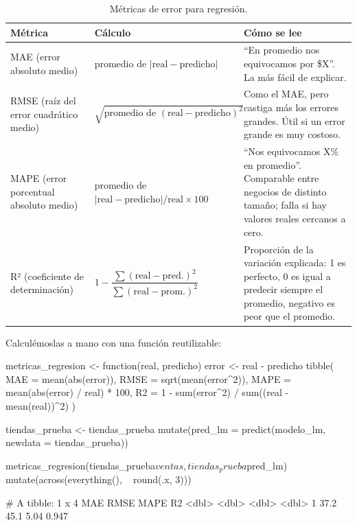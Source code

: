 \begin{table}[H]
\centering
\small
\caption{Métricas de error para regresión.}
\label{tab:m7-metricas-reg}
\begin{tabularx}{\textwidth}{>{\raggedright\arraybackslash}p{2.2cm}
                              >{\raggedright\arraybackslash}p{5.4cm}
                              >{\raggedright\arraybackslash}X}
\toprule
\textbf{Métrica} & \textbf{Cálculo} & \textbf{Cómo se lee} \\
\midrule
MAE (error absoluto medio) & promedio de $|\text{real} - \text{predicho}|$ &
  ``En promedio nos equivocamos por \$X''. La más fácil de explicar. \\
RMSE (raíz del error cuadrático medio) &
  $\sqrt{\text{promedio de } (\text{real} - \text{predicho})^2}$ &
  Como el MAE, pero castiga más los errores grandes. Útil si un error grande
  es muy costoso. \\
MAPE (error porcentual absoluto medio) &
  promedio de $|\text{real} - \text{predicho}| / \text{real} \times 100$ &
  ``Nos equivocamos X\% en promedio''. Comparable entre negocios de distinto
  tamaño; falla si hay valores reales cercanos a cero. \\
R² (coeficiente de determinación) &
  $1 - \dfrac{\sum (\text{real} - \text{pred.})^2}{\sum (\text{real} - \text{prom.})^2}$ &
  Proporción de la variación explicada: 1 es perfecto, 0 es igual a predecir
  siempre el promedio, negativo es peor que el promedio. \\
\bottomrule
\end{tabularx}
\end{table}

Calculémoslas a mano con una función reutilizable:

\begin{rcode}
metricas_regresion <- function(real, predicho) {
  error <- real - predicho
  tibble(
    MAE  = mean(abs(error)),
    RMSE = sqrt(mean(error^2)),
    MAPE = mean(abs(error) / real) * 100,
    R2   = 1 - sum(error^2) / sum((real - mean(real))^2)
  )
}

tiendas_prueba <- tiendas_prueba %
  mutate(pred_lm = predict(modelo_lm, newdata = tiendas_prueba))

metricas_regresion(tiendas_prueba$ventas, tiendas_prueba$pred_lm) %
  mutate(across(everything(), ~ round(.x, 3)))
\end{rcode}

\begin{rsalida}
# A tibble: 1 x 4
    MAE  RMSE  MAPE    R2
  <dbl> <dbl> <dbl> <dbl>
1  37.2  45.1  5.04 0.947
\end{rsalida}


